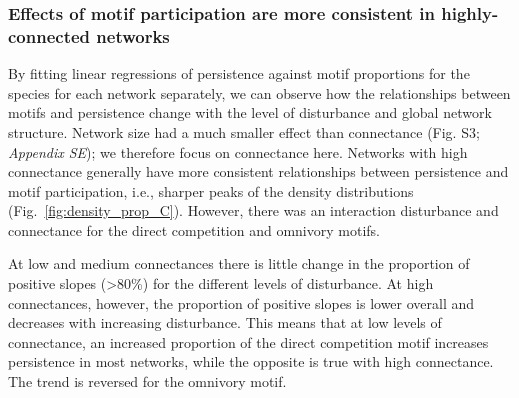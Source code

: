 \documentclass[12pt]{article}
\begin{document}
\begin{spacing}{2.0}
        \clearpage
    
        \subsubsection*{Effects of motif participation are more consistent in highly-connected networks}

            By fitting linear regressions of persistence against motif proportions for the species for each network separately, we can observe how the relationships between motifs and persistence change with the level of disturbance and global network structure. Network size had a much smaller effect than connectance (Fig. S3; \emph{Appendix SE}); we therefore focus on connectance here. 
            Networks with high connectance generally have more consistent relationships between persistence and motif participation, i.e., sharper peaks of the density distributions (Fig.~\ref{fig:density_prop_C}). 
            However, there was an interaction disturbance and connectance for the direct competition and omnivory motifs.
            
            
            At low and medium connectances there is little change in the proportion of positive slopes (\textgreater80\%) for the different levels of disturbance. 
            At high connectances, however, the proportion of positive slopes is lower overall and decreases with increasing disturbance. 
            This means that at low levels of connectance, an increased proportion of the direct competition motif increases persistence in most networks, while the opposite is true with high connectance. 
            The trend is reversed for the omnivory motif.



\end{spacing}
\end{document}
